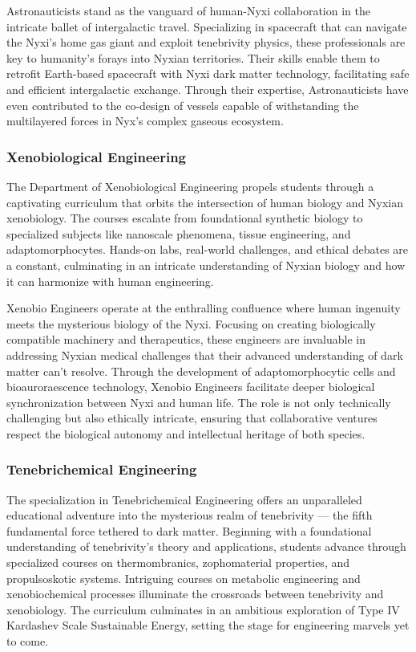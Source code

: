 Astronauticists stand as the vanguard of human-Nyxi collaboration in the
intricate ballet of intergalactic travel. Specializing in spacecraft that can
navigate the Nyxi's home gas giant and exploit tenebrivity physics, these
professionals are key to humanity's forays into Nyxian territories. Their
skills enable them to retrofit Earth-based spacecraft with Nyxi dark matter
technology, facilitating safe and efficient intergalactic exchange. Through
their expertise, Astronauticists have even contributed to the co-design of
vessels capable of withstanding the multilayered forces in Nyx's complex
gaseous ecosystem.

\subsubsection{Xenobiological Engineering}
The Department of Xenobiological Engineering propels students through a
captivating curriculum that orbits the intersection of human biology and Nyxian
xenobiology. The courses escalate from foundational synthetic biology to
specialized subjects like nanoscale phenomena, tissue engineering, and
adaptomorphocytes. Hands-on labs, real-world challenges, and ethical debates
are a constant, culminating in an intricate understanding of Nyxian biology and
how it can harmonize with human engineering.

Xenobio Engineers operate at the enthralling confluence where human ingenuity
meets the mysterious biology of the Nyxi. Focusing on creating biologically
compatible machinery and therapeutics, these engineers are invaluable in
addressing Nyxian medical challenges that their advanced understanding of dark
matter can't resolve. Through the development of adaptomorphocytic cells and
bioauroraescence technology, Xenobio Engineers facilitate deeper biological
synchronization between Nyxi and human life. The role is not only technically
challenging but also ethically intricate, ensuring that collaborative ventures
respect the biological autonomy and intellectual heritage of both species.

\subsubsection{Tenebrichemical Engineering}
The specialization in Tenebrichemical Engineering offers an unparalleled
educational adventure into the mysterious realm of tenebrivity — the fifth
fundamental force tethered to dark matter. Beginning with a foundational
understanding of tenebrivity's theory and applications, students advance
through specialized courses on thermombranics, zophomaterial properties, and
propulsoskotic systems. Intriguing courses on metabolic engineering and
xenobiochemical processes illuminate the crossroads between tenebrivity and
xenobiology. The curriculum culminates in an ambitious exploration of Type IV
Kardashev Scale Sustainable Energy, setting the stage for engineering marvels
yet to come.

